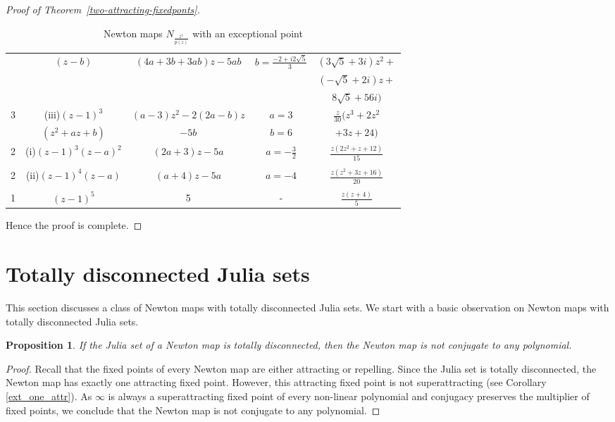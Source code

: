 \documentclass[12pt]{article}
\newtheorem{prop}{Proposition}[section]
\numberwithin{equation}{section}
\begin{document}
\begin{proof}[Proof of Theorem~\ref{two-attracting-fixedponts}]
\begin{enumerate}
{\begin{enumerate}
\begin{table}
\begin{tabular}{|c |c|c|c|c| }
&  $(z-b)$ 		&$ (4a+3b+3ab)z-5ab$	&		$b= \frac{-2+ i 2 \sqrt{5}}{3}$	&$(3\sqrt{5}+3i)z^2+ $	\\ 
&   	    	&					 	&									 	& 	$(-\sqrt{5}+2i)z+  $\\ 
&   	    	&					 	&									 	& 	$8\sqrt{5}+56i)   $\\ 
\hline
3&(iii)$(z-1)^3$& $(a-3)z^2 -2(2a -b)z$&$a= 3$& $\frac{z }{30}(z^3 +2z^2$ \\ 
 & $(z^2 +az+b)$& $-5b$				&$b=6$ & $  +3z+24)$ \\ 
\hline
2&(i)$(z-1)^3(z-a)^2$& $(2a+3)z-5a$&$a= -\frac{3}{2}$& $\frac{z(2z^2 +z +12)}{15}$ \\ 
 & 			&			&				 &						   \\ 
\hline
2 & (ii)$(z-1)^4(z-a)$& $(a+4)z-5a$   &$a=-4$ & $\frac{z(z^2 +3z +16)}{20}$ \\ 
 &  & &  &  \\ 
\hline
1 &  $(z-1)^5$&5&-& $\frac{z(z+4)}{5}$\\ 
\hline		
	
\end{tabular}
\caption{Newton  maps  $N_{\frac{z^5}{p(z)}}$  with an exceptional point }
\label{d=5}	
\end{table}
 \end{enumerate}}	
 \end{enumerate} 
Hence the proof is complete.
\end{proof}

\section{Totally disconnected Julia sets}\label{Sec4_totally_discon}
This section discusses a class of Newton maps with totally disconnected Julia sets. We start with a basic observation on Newton maps with totally disconnected Julia sets.
\begin{prop}
If the Julia set of a Newton map is totally disconnected, then the Newton map is not conjugate to any polynomial.
\end{prop}
\begin{proof}
Recall that the fixed points of every Newton map are either attracting or repelling. Since the Julia set is totally disconnected, the Newton map has exactly one attracting fixed point. However, this attracting fixed point is not superattracting (see Corollary \ref{ext_one_attr}).
As $\infty$ is always a superattracting fixed point of every non-linear polynomial and conjugacy preserves the multiplier of fixed points, we conclude that the Newton map is not conjugate to any polynomial.
\end{proof}
 
\end{document}
